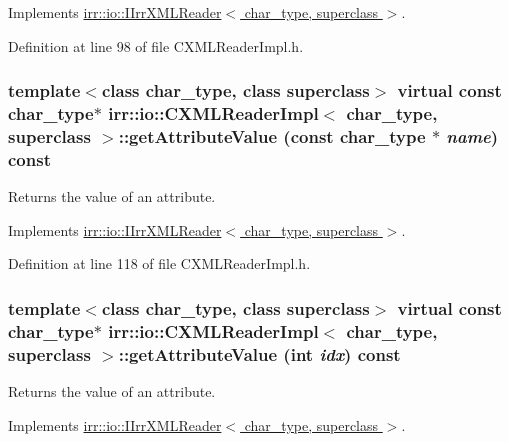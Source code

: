 Implements \hyperlink{classirr_1_1io_1_1_i_irr_x_m_l_reader_a0807dc565c67fcf355e656df1a326ef}{irr::io::IIrrXMLReader$<$ char\_\-type, superclass $>$}.

Definition at line 98 of file CXMLReaderImpl.h.\hypertarget{classirr_1_1io_1_1_c_x_m_l_reader_impl_7252bf5d02f9cc05ade31e658502116a}{
\subsubsection[{getAttributeValue}]{\setlength{\rightskip}{0pt plus 5cm}template$<$class char\_\-type, class superclass$>$ virtual const char\_\-type$\ast$ {\bf irr::io::CXMLReaderImpl}$<$ char\_\-type, {\bf superclass} $>$::getAttributeValue (const char\_\-type $\ast$ {\em name}) const}}
\label{classirr_1_1io_1_1_c_x_m_l_reader_impl_7252bf5d02f9cc05ade31e658502116a}


Returns the value of an attribute. 



Implements \hyperlink{classirr_1_1io_1_1_i_irr_x_m_l_reader_daac9a49b396e7fc2d335335f36391a9}{irr::io::IIrrXMLReader$<$ char\_\-type, superclass $>$}.

Definition at line 118 of file CXMLReaderImpl.h.\hypertarget{classirr_1_1io_1_1_c_x_m_l_reader_impl_55bc001ac65fa308a04b65bc1529aa4b}{
\subsubsection[{getAttributeValue}]{\setlength{\rightskip}{0pt plus 5cm}template$<$class char\_\-type, class superclass$>$ virtual const char\_\-type$\ast$ {\bf irr::io::CXMLReaderImpl}$<$ char\_\-type, {\bf superclass} $>$::getAttributeValue (int {\em idx}) const}}
\label{classirr_1_1io_1_1_c_x_m_l_reader_impl_55bc001ac65fa308a04b65bc1529aa4b}


Returns the value of an attribute. 



Implements \hyperlink{classirr_1_1io_1_1_i_irr_x_m_l_reader_41bd71a1b9d4a80cd1d0257dedb35325}{irr::io::IIrrXMLReader$<$ char\_\-type, superclass $>$}.

